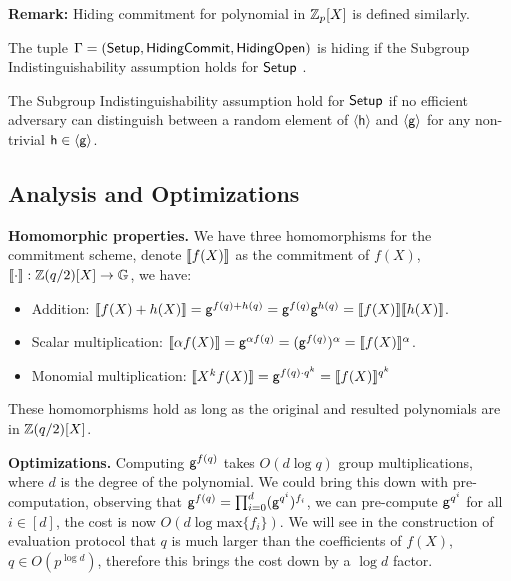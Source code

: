 \textbf{Remark:} Hiding commitment for polynomial in $\mathbb{Z}_p[X]$ is defined similarly.

\begin{theorem}
The tuple $\Gamma = (\mathsf{Setup}, \mathsf{HidingCommit}, \mathsf{HidingOpen})$ is \textup{hiding} if the \textup{Subgroup Indistinguishability assumption} holds for $\mathsf{Setup}$ \cite{bunz2020transparent}.
\end{theorem}

\begin{definition}
The \textup{Subgroup Indistinguishability assumption} hold for $\mathsf{Setup}$ if no efficient adversary can distinguish between a random element of $\langle \mathsf{h} \rangle$ and $\langle \mathsf{g} \rangle$ for any non-trivial $\mathsf{h} \in \langle \mathsf{g} \rangle$.
\end{definition}

\subsection{Analysis and Optimizations}

\textbf{Homomorphic properties.} We have three homomorphisms for the commitment scheme, denote $\llbracket f(X) \rrbracket$ as the commitment of $f(X)$, $\llbracket \cdot \rrbracket: \mathbb{Z}(q/2)[X] \to \mathbb{G}$, we have:
\begin{itemize}
    \item Addition: $\llbracket f(X) + h(X) \rrbracket = \mathsf{g}^{f(q) + h(q)} = \mathsf{g}^{f(q)} \mathsf{g}^{h(q)} = \llbracket f(X) \rrbracket\llbracket h(X) \rrbracket$.
    \item Scalar multiplication: $\llbracket \alpha f(X) \rrbracket = \mathsf{g}^{\alpha f(q)} = (\mathsf{g}^{f(q)})^{\alpha} = \llbracket f(X) \rrbracket^{\alpha}$.
    \item Monomial multiplication: $\llbracket X^k f(X) \rrbracket = \mathsf{g}^{f(q) \cdot q^k} = \llbracket f(X) \rrbracket^{q^k}$
\end{itemize}
These homomorphisms hold as long as the original and resulted polynomials are in $\mathbb{Z}(q/2)[X]$.

\textbf{Optimizations.} Computing $\mathsf{g}^{f(q)}$ takes $O(d\log q)$ group multiplications, where $d$ is the degree of the polynomial. We could bring this down with pre-computation, observing that $\mathsf{g}^{f(q)} = \prod_{i=0}^d (\mathsf{g}^{q^i})^{f_i}$, we can pre-compute $\mathsf{g}^{q^i}$ for all $i \in [d]$, the cost is now $O(d\log \mathrm{max}\{f_i\})$. We will see in the construction of evaluation protocol that $q$ is much larger than the coefficients of $f(X)$, $q \in O(p^{\log d})$, therefore this brings the cost down by a $\log d$ factor.

